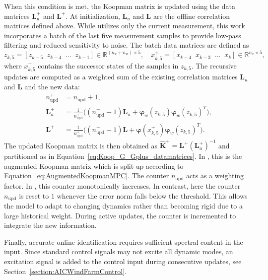 When this condition is met, the Koopman matrix is updated using the data matrices $\mathbf{L}_u^+$ and $\mathbf{L}^+$. At initialization, $\mathbf{L}_u$ and $\mathbf{L}$ are the offline correlation matrices defined above. While \cite{cisneros2020data} utilizes only the current measurement, this work incorporates a batch of the last five measurement samples to provide low-pass filtering and reduced sensitivity to noise. The batch data matrices are defined as
\[
z_{k,5} = [z_{k-5} \;\; z_{k-4} \;\; \dots \;\; z_{k-1}] \in \mathbb{R}^{(n_x + n_w)\times 5}, \quad
x_{k,5}^+ = [x_{k-4} \;\; x_{k-3} \;\; \dots \;\; x_{k}] \in \mathbb{R}^{n_x \times 5},
\]
where $x_{k,5}^+$ contains the successor states of the samples in $z_{k,5}$.
The recursive updates are computed as a weighted sum of the existing correlation matrices $\mathbf{L}_u$ and $\mathbf{L}$ and the new data:
\begin{equation} \label{eq:GA_online}
    \begin{split}
        n_{\text{upd}}^+ &= n_{\text{upd}} + 1,\\
        \mathbf{L}_u^+ &= \frac{1}{n_{\text{upd}}^+} \Big( (n_{\text{upd}}^+-1)\mathbf{L}_u + \bm{\varphi}_w(z_{k,5}) \bm{\varphi}_w(z_{k,5})^T \Big),\\
        \mathbf{L}^+ &= \frac{1}{n_{\text{upd}}^+} \Big( (n_{\text{upd}}^+-1)\mathbf{L} + \bm{\varphi}(x_{k,5}^+) \bm{\varphi}_w(z_{k,5})^T \Big).
    \end{split}
\end{equation}
The updated Koopman matrix is then obtained as $\hat{\bm{K}}^+ = \mathbf{L}^+ (\mathbf{L}_u^+)^{-1}$ and partitioned as in Equation~\eqref{eq:Koop_G_Gplus_datamatrices}. In \cite{dittmer2022data}, this is the augmented Koopman matrix which is split up according to Equation~\eqref{eq:AugmentedKoopmanMPC}.
The counter $n_{\text{upd}}$ acts as a weighting factor. In \cite{cisneros2020data}, this counter monotonically increases. In contrast, here the counter $n_{\text{upd}}$ is reset to $1$ whenever the error norm falls below the threshold. This allows the model to adapt to changing dynamics rather than becoming rigid due to a large historical weight. During active updates, the counter is incremented to integrate the new information.

Finally, accurate online identification requires sufficient spectral content in the input. Since standard control signals may not excite all dynamic modes, an excitation signal is added to the control input during consecutive updates, see Section~\ref{section:AICWindFarmControl}.

